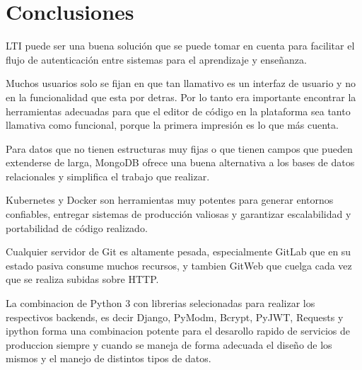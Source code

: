 
\chapter{Conclusiones}
\label{capitulo7}

LTI puede ser una buena solución que se puede tomar en cuenta para facilitar el flujo de autenticación entre sistemas para el aprendizaje y enseñanza.

Muchos usuarios solo se fijan en que tan llamativo es un interfaz de usuario y no en la funcionalidad que esta por detras. Por lo tanto era importante encontrar la herramientas adecuadas para que el editor de código en la plataforma sea tanto llamativa como funcional, porque la primera impresión es lo que más cuenta.

Para datos que no tienen estructuras muy fijas o que tienen campos que pueden extenderse de larga, MongoDB ofrece una buena alternativa a los bases de datos relacionales y simplifica el trabajo que realizar.

Kubernetes y Docker son herramientas muy potentes para generar entornos confiables, entregar sistemas de producción valiosas y garantizar escalabilidad y portabilidad de código realizado.

Cualquier servidor de Git es altamente pesada, especialmente GitLab que en su estado pasiva consume muchos recursos, y tambien GitWeb que cuelga cada vez que se realiza subidas sobre HTTP.

La combinacion de Python 3 con librerias selecionadas para realizar los respectivos backends, es decir Django, PyModm, Bcrypt, PyJWT, Requests y ipython forma una combinacion potente para el desarollo rapido de servicios de produccion siempre y cuando se maneja de forma adecuada el diseño de los mismos y el manejo de distintos tipos de datos.
